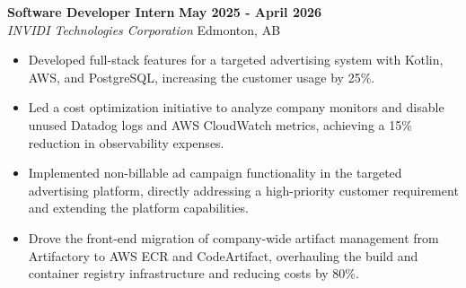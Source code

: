 \documentclass[12pt, letterpaper]{article}
\newenvironment{highlights}{
    \begin{itemize}[
        topsep=0.10 cm,
        parsep=0.10 cm,
        partopsep=0pt,
        itemsep=0pt,
        leftmargin=0.4 cm + 10pt
    ]
}{
    \end{itemize}
} %
\begin{document}
\noindent
\textbf{Software Developer Intern} \hfill \textbf{May 2025 - April 2026} \\ %
\textit{INVIDI Technologies Corporation} \hfill Edmonton, AB%
\begin{highlights}
    \item Developed full-stack features for a targeted advertising system with Kotlin, AWS, and PostgreSQL, increasing the customer usage by 25\%. 
    \item Led a cost optimization initiative to analyze company monitors and disable unused Datadog logs and AWS CloudWatch metrics, achieving a 15\% reduction in observability expenses.
    \item Implemented non-billable ad campaign functionality in the targeted advertising platform, directly addressing a high-priority customer requirement and extending the platform capabilities.
    \item Drove the front-end migration of company-wide artifact management from Artifactory to AWS ECR and CodeArtifact, overhauling the build and container registry infrastructure and reducing costs by 80\%.
    
\end{highlights}
\end{document}
